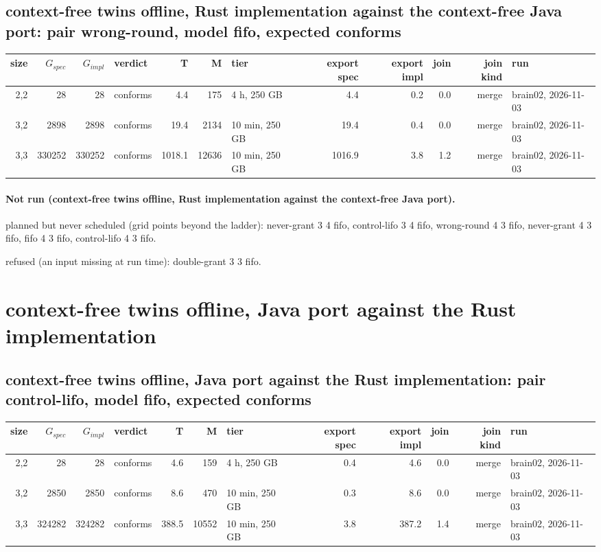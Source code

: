 \documentclass[10pt]{article}
\begin{document}
\subsection*{context-free twins offline, Rust implementation against the context-free Java port: pair \textsf{wrong-round}, model fifo, expected conforms}
\begin{longtable}{@{}rrrlrrlrrrrl@{}}
\toprule
size & $G_{\mathit{spec}}$ & $G_{\mathit{impl}}$ & verdict & T & M & tier & export spec & export impl & join & join kind & run \\
\midrule
\endhead
\color{blue} 2,2 & 28 & 28 & conforms & 4.4 & 175 & 4 h, 250 GB & 4.4 & 0.2 & 0.0 & merge & brain02, 2026-11-03 \\
\color{blue} 3,2 & 2898 & 2898 & conforms & 19.4 & 2134 & 10 min, 250 GB & 19.4 & 0.4 & 0.0 & merge & brain02, 2026-11-03 \\
\color{blue} 3,3 & 330252 & 330252 & conforms & 1018.1 & 12636 & 10 min, 250 GB & 1016.9 & 3.8 & 1.2 & merge & brain02, 2026-11-03 \\
\bottomrule
\end{longtable}
\paragraph{Not run (context-free twins offline, Rust implementation against the context-free Java port).}
planned but never scheduled (grid points beyond the ladder): never-grant 3 4 fifo, control-lifo 3 4 fifo, wrong-round 4 3 fifo, never-grant 4 3 fifo, fifo 4 3 fifo, control-lifo 4 3 fifo.\par
refused (an input missing at run time): double-grant 3 3 fifo.\par
\section*{context-free twins offline, Java port against the Rust implementation}
\subsection*{context-free twins offline, Java port against the Rust implementation: pair \textsf{control-lifo}, model fifo, expected conforms}
\begin{longtable}{@{}rrrlrrlrrrrl@{}}
\toprule
size & $G_{\mathit{spec}}$ & $G_{\mathit{impl}}$ & verdict & T & M & tier & export spec & export impl & join & join kind & run \\
\midrule
\endhead
\color{blue} 2,2 & 28 & 28 & conforms & 4.6 & 159 & 4 h, 250 GB & 0.4 & 4.6 & 0.0 & merge & brain02, 2026-11-03 \\
\color{blue} 3,2 & 2850 & 2850 & conforms & 8.6 & 470 & 10 min, 250 GB & 0.3 & 8.6 & 0.0 & merge & brain02, 2026-11-03 \\
\color{blue} 3,3 & 324282 & 324282 & conforms & 388.5 & 10552 & 10 min, 250 GB & 3.8 & 387.2 & 1.4 & merge & brain02, 2026-11-03 \\
\bottomrule
\end{longtable}
\end{document}
